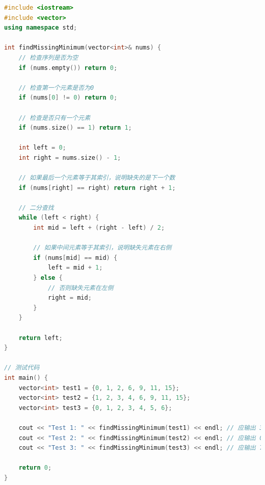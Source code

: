 \documentclass[12pt,twoside]{article}
\begin{document}
\begin{problems}
\begin{lstlisting}[language=C++]
#include <iostream>
#include <vector>
using namespace std;

int findMissingMinimum(vector<int>& nums) {
    // 检查序列是否为空
    if (nums.empty()) return 0;
    
    // 检查第一个元素是否为0
    if (nums[0] != 0) return 0;
    
    // 检查是否只有一个元素
    if (nums.size() == 1) return 1;
    
    int left = 0;
    int right = nums.size() - 1;
    
    // 如果最后一个元素等于其索引，说明缺失的是下一个数
    if (nums[right] == right) return right + 1;
    
    // 二分查找
    while (left < right) {
        int mid = left + (right - left) / 2;
        
        // 如果中间元素等于其索引，说明缺失元素在右侧
        if (nums[mid] == mid) {
            left = mid + 1;
        } else {
            // 否则缺失元素在左侧
            right = mid;
        }
    }
    
    return left;
}

// 测试代码
int main() {
    vector<int> test1 = {0, 1, 2, 6, 9, 11, 15};
    vector<int> test2 = {1, 2, 3, 4, 6, 9, 11, 15};
    vector<int> test3 = {0, 1, 2, 3, 4, 5, 6};
    
    cout << "Test 1: " << findMissingMinimum(test1) << endl; // 应输出 3
    cout << "Test 2: " << findMissingMinimum(test2) << endl; // 应输出 0
    cout << "Test 3: " << findMissingMinimum(test3) << endl; // 应输出 7
    
    return 0;
}
\end{lstlisting}

\eparts




\end{problems}
\end{document}

